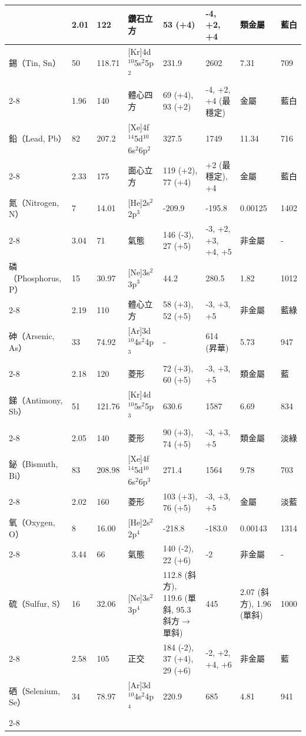 \documentclass[a4paper,12pt]{report}
\begin{document}
\begin{longtable}[c]{|p{}|p{}|p{}|p{}|p{}|p{}|p{}|p{}|}
& 2.01 & 122 & 鑽石立方 & 53 (+4) & -4, +2, +4 & 類金屬 & 藍白\\\hline
錫（Tin, Sn） & 50 & 118.71 & [Kr]4d$^{10}$5s$^2$5p$^2$ & 231.9 & 2602 & 7.31 & 709\\\cline{2-8}
& 1.96 & 140 & 體心四方 & 69 (+4), 93 (+2) & -4, +2, +4 (最穩定) & 金屬 & 藍白\\\hline
鉛（Lead, Pb） & 82 & 207.2 & [Xe]4f$^{14}$5d$^{10}$6s$^2$6p$^2$ & 327.5 & 1749 & 11.34 & 716\\\cline{2-8}
& 2.33 & 175 & 面心立方 & 119 (+2), 77 (+4) & +2 (最穩定), +4 & 金屬 & 藍白\\\hline
氮（Nitrogen, N） & 7 & 14.01 & [He]2s$^2$2p$^3$ & -209.9 & -195.8 & 0.00125 & 1402\\\cline{2-8}
& 3.04 & 71 & 氣態 & 146 (-3), 27 (+5) & -3, +2, +3, +4, +5 & 非金屬 & -\\\hline
磷（Phosphorus, P） & 15 & 30.97 & [Ne]3s$^2$3p$^3$ & 44.2 & 280.5 & 1.82 & 1012\\\cline{2-8}
& 2.19 & 110 & 體心立方 & 58 (+3), 52 (+5) & -3, +3, +5 & 非金屬 & 藍綠\\\hline
砷（Arsenic, As） & 33 & 74.92 & [Ar]3d$^{10}$4s$^2$4p$^3$ & - & 614 (昇華) & 5.73 & 947\\\cline{2-8}
& 2.18 & 120 & 菱形 & 72 (+3), 60 (+5) & -3, +3, +5 & 類金屬 & 藍\\\hline
銻（Antimony, Sb） & 51 & 121.76 & [Kr]4d$^{10}$5s$^2$5p$^3$ & 630.6 & 1587 & 6.69 & 834\\\cline{2-8}
& 2.05 & 140 & 菱形 & 90 (+3), 74 (+5) & -3, +3, +5 & 類金屬 & 淡綠\\\hline
鉍（Bismuth, Bi） & 83 & 208.98 & [Xe]4f$^{14}$5d$^{10}$6s$^2$6p$^3$ & 271.4 & 1564 & 9.78 & 703\\\cline{2-8}
& 2.02 & 160 & 菱形 & 103 (+3), 76 (+5) & -3, +3, +5 & 金屬 & 淡藍\\\hline
氧（Oxygen, O） & 8 & 16.00 & [He]2s$^2$2p$^4$ & -218.8 & -183.0 & 0.00143 & 1314\\\cline{2-8}
& 3.44 & 66 & 氣態 & 140 (-2), 22 (+6) & -2 & 非金屬 & -\\\hline
硫（Sulfur, S） & 16 & 32.06 & [Ne]3s$^2$3p$^4$ & 112.8 (斜方), 119.6 (單斜, 95.3 斜方$\to$單斜) & 445 & 2.07 (斜方), 1.96 (單斜) & 1000\\\cline{2-8}
& 2.58 & 105 & 正交 & 184 (-2), 37 (+4), 29 (+6) & -2, +2, +4, +6 & 非金屬 & 藍\\\hline
硒（Selenium, Se） & 34 & 78.97 & [Ar]3d$^{10}$4s$^2$4p$^4$ & 220.9 & 685 & 4.81 & 941\\\cline{2-8}

\end{longtable}
\end{document}
